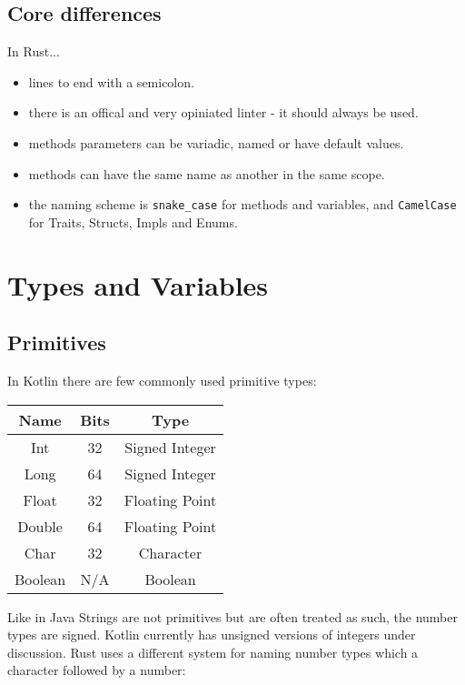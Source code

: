 \documentclass[a4paper,11pt]{article}
\begin{document}
\subsection{Core differences}
In Rust...
\begin{itemize}
	\item lines to end with a semicolon.
  \item there is an offical and very opiniated linter - it should always be used.
  \item methods parameters can be variadic, named or have default values.
  \item methods can have the same name as another in the same scope.
  \item the naming scheme is \lstinline{snake_case} for methods and variables, and \lstinline{CamelCase} for Traits, Structs, Impls and Enums.
\end{itemize}

\newpage
\section{Types and Variables}
\subsection{Primitives}
In Kotlin there are few commonly used primitive types:

\renewcommand{\arraystretch}{1.3}

\begin{center}
\begin{tabular}{ c|c|c } 
 
 Name & Bits & Type \\ 
 \hline
 Int & 32 & Signed Integer \\ 
 Long & 64 & Signed Integer \\ 
 Float & 32 & Floating Point \\ 
 Double & 64 & Floating Point \\ 
 Char & 32 & Character \\ 
 Boolean & N/A & Boolean \\ 
 
\end{tabular}
\end{center}

Like in Java Strings are not primitives but are often treated as such, the number types are signed.
Kotlin currently has unsigned versions of integers under discussion.
\newline
\newline
Rust uses a different system for naming number types which a character followed by a number:
\end{document}
